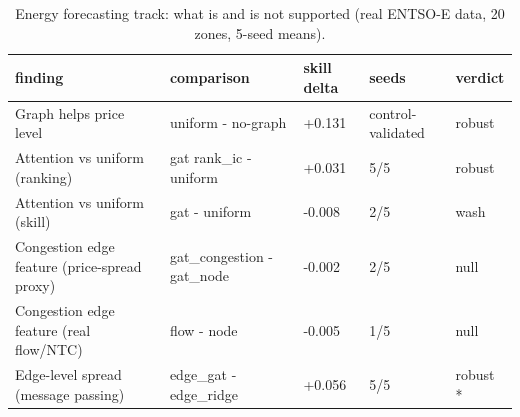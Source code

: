\begin{table}[htbp]
  \centering
  \small
  \caption{Energy forecasting track: what is and is not supported (real ENTSO-E data, 20 zones, 5-seed means).}
  \label{tab:energy-findings}
  \begin{tabular}{>{\raggedright\arraybackslash}p{}>{\raggedright\arraybackslash}p{}lll}
    \toprule
    finding & comparison & skill delta & seeds & verdict \\
    \midrule
    Graph helps price level & uniform - no-graph & +0.131 & control-validated & robust \\
    Attention vs uniform (ranking) & gat rank\_ic - uniform & +0.031 & 5/5 & robust \\
    Attention vs uniform (skill) & gat - uniform & -0.008 & 2/5 & wash \\
    Congestion edge feature (price-spread proxy) & gat\_congestion - gat\_node & -0.002 & 2/5 & null \\
    Congestion edge feature (real flow/NTC) & flow - node & -0.005 & 1/5 & null \\
    Edge-level spread (message passing) & edge\_gat - edge\_ridge & +0.056 & 5/5 & robust * \\
    \bottomrule
  \end{tabular}
\end{table}
